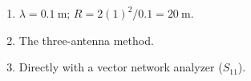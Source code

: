 \begin{enumerate}[leftmargin=1.6em,itemsep=2pt]
\item $\lambda = 0.1\ \text{m}$; $R = 2(1)^2/0.1 = 20\ \text{m}$.
\item The three-antenna method.
\item Directly with a vector network analyzer ($S_{11}$).
\end{enumerate}
